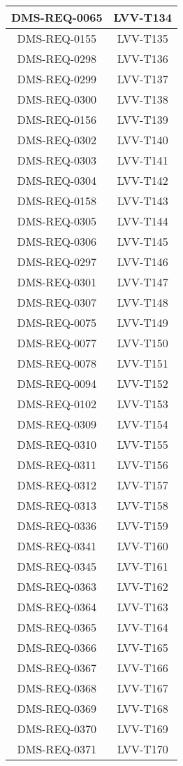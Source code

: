 \begin{longtable}{|c|c|}
DMS-REQ-0065 & LVV-T134\\\hline
DMS-REQ-0155 & LVV-T135\\\hline
DMS-REQ-0298 & LVV-T136\\\hline
DMS-REQ-0299 & LVV-T137\\\hline
DMS-REQ-0300 & LVV-T138\\\hline
DMS-REQ-0156 & LVV-T139\\\hline
DMS-REQ-0302 & LVV-T140\\\hline
DMS-REQ-0303 & LVV-T141\\\hline
DMS-REQ-0304 & LVV-T142\\\hline
DMS-REQ-0158 & LVV-T143\\\hline
DMS-REQ-0305 & LVV-T144\\\hline
DMS-REQ-0306 & LVV-T145\\\hline
DMS-REQ-0297 & LVV-T146\\\hline
DMS-REQ-0301 & LVV-T147\\\hline
DMS-REQ-0307 & LVV-T148\\\hline
DMS-REQ-0075 & LVV-T149\\\hline
DMS-REQ-0077 & LVV-T150\\\hline
DMS-REQ-0078 & LVV-T151\\\hline
DMS-REQ-0094 & LVV-T152\\\hline
DMS-REQ-0102 & LVV-T153\\\hline
DMS-REQ-0309 & LVV-T154\\\hline
DMS-REQ-0310 & LVV-T155\\\hline
DMS-REQ-0311 & LVV-T156\\\hline
DMS-REQ-0312 & LVV-T157\\\hline
DMS-REQ-0313 & LVV-T158\\\hline
DMS-REQ-0336 & LVV-T159\\\hline
DMS-REQ-0341 & LVV-T160\\\hline
DMS-REQ-0345 & LVV-T161\\\hline
DMS-REQ-0363 & LVV-T162\\\hline
DMS-REQ-0364 & LVV-T163\\\hline
DMS-REQ-0365 & LVV-T164\\\hline
DMS-REQ-0366 & LVV-T165\\\hline
DMS-REQ-0367 & LVV-T166\\\hline
DMS-REQ-0368 & LVV-T167\\\hline
DMS-REQ-0369 & LVV-T168\\\hline
DMS-REQ-0370 & LVV-T169\\\hline
DMS-REQ-0371 & LVV-T170\\\hline

\end{longtable}
